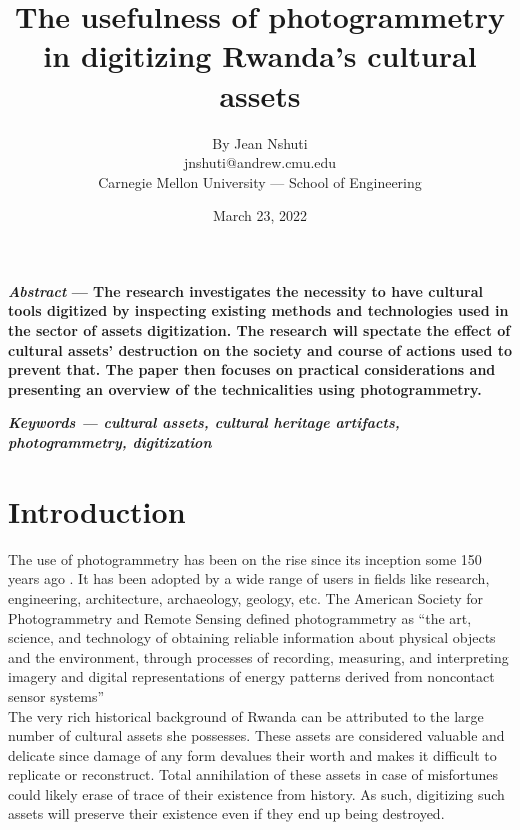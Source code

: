 \documentclass[conference]{IEEEtran}
\begin{document}
\title{\Large{\textbf{The usefulness of photogrammetry in digitizing Rwanda's cultural assets}}}
\author{By Jean Nshuti \\ jnshuti@andrew.cmu.edu \\ Carnegie Mellon University — School of Engineering}
\date{March 23, 2022}
\maketitle

\textbf{\textit{Abstract} — The research investigates the necessity to have cultural tools digitized by inspecting existing methods
    and technologies used in the sector of assets digitization. The research will spectate the effect of cultural assets' destruction on the society
    and course of actions used to prevent that. The paper then focuses on practical considerations and presenting an overview of the technicalities using photogrammetry. \\}

\textbf{\textit{Keywords — cultural assets, cultural heritage artifacts, photogrammetry, digitization}}

\section{\textbf{Introduction}}
The use of photogrammetry has been on the rise since its inception some 150 years ago \cite{histphtgm}. It has been adopted by a wide range of users in fields
like research, engineering, architecture, archaeology, geology, etc.
The  American Society for Photogrammetry and Remote Sensing defined photogrammetry as \cite{Ebert2015} “the art, science, and technology
of obtaining reliable information about physical objects and the environment, through processes of recording, measuring,
and interpreting imagery and digital representations of energy patterns derived from noncontact sensor systems” \\

The very rich historical background of Rwanda can be attributed to the large number of cultural assets she possesses. These assets are considered valuable and
delicate since damage of any form devalues their worth and makes it difficult to replicate or reconstruct. Total annihilation of these assets in case of misfortunes
could likely erase of trace of their existence from history. As such, digitizing such assets will preserve their existence even if they end up being destroyed. \\
\end{document}
